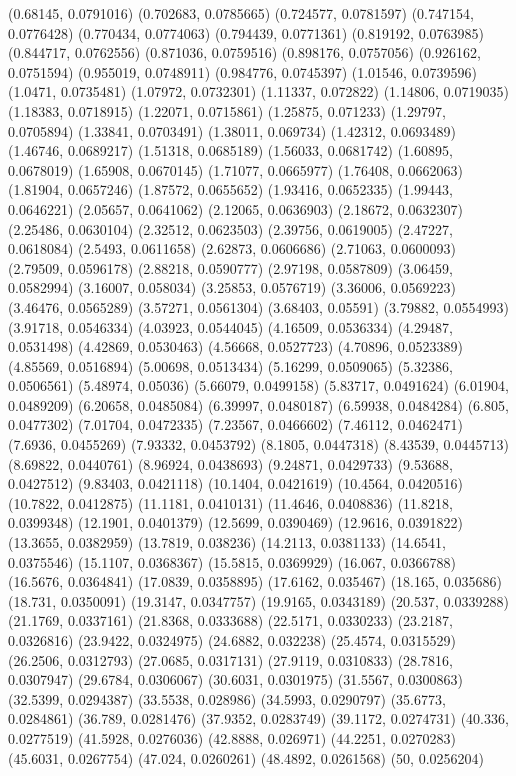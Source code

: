 {(0.68145, 0.0791016)
(0.702683, 0.0785665)
(0.724577, 0.0781597)
(0.747154, 0.0776428)
(0.770434, 0.0774063)
(0.794439, 0.0771361)
(0.819192, 0.0763985)
(0.844717, 0.0762556)
(0.871036, 0.0759516)
(0.898176, 0.0757056)
(0.926162, 0.0751594)
(0.955019, 0.0748911)
(0.984776, 0.0745397)
(1.01546, 0.0739596)
(1.0471, 0.0735481)
(1.07972, 0.0732301)
(1.11337, 0.072822)
(1.14806, 0.0719035)
(1.18383, 0.0718915)
(1.22071, 0.0715861)
(1.25875, 0.071233)
(1.29797, 0.0705894)
(1.33841, 0.0703491)
(1.38011, 0.069734)
(1.42312, 0.0693489)
(1.46746, 0.0689217)
(1.51318, 0.0685189)
(1.56033, 0.0681742)
(1.60895, 0.0678019)
(1.65908, 0.0670145)
(1.71077, 0.0665977)
(1.76408, 0.0662063)
(1.81904, 0.0657246)
(1.87572, 0.0655652)
(1.93416, 0.0652335)
(1.99443, 0.0646221)
(2.05657, 0.0641062)
(2.12065, 0.0636903)
(2.18672, 0.0632307)
(2.25486, 0.0630104)
(2.32512, 0.0623503)
(2.39756, 0.0619005)
(2.47227, 0.0618084)
(2.5493, 0.0611658)
(2.62873, 0.0606686)
(2.71063, 0.0600093)
(2.79509, 0.0596178)
(2.88218, 0.0590777)
(2.97198, 0.0587809)
(3.06459, 0.0582994)
(3.16007, 0.058034)
(3.25853, 0.0576719)
(3.36006, 0.0569223)
(3.46476, 0.0565289)
(3.57271, 0.0561304)
(3.68403, 0.05591)
(3.79882, 0.0554993)
(3.91718, 0.0546334)
(4.03923, 0.0544045)
(4.16509, 0.0536334)
(4.29487, 0.0531498)
(4.42869, 0.0530463)
(4.56668, 0.0527723)
(4.70896, 0.0523389)
(4.85569, 0.0516894)
(5.00698, 0.0513434)
(5.16299, 0.0509065)
(5.32386, 0.0506561)
(5.48974, 0.05036)
(5.66079, 0.0499158)
(5.83717, 0.0491624)
(6.01904, 0.0489209)
(6.20658, 0.0485084)
(6.39997, 0.0480187)
(6.59938, 0.0484284)
(6.805, 0.0477302)
(7.01704, 0.0472335)
(7.23567, 0.0466602)
(7.46112, 0.0462471)
(7.6936, 0.0455269)
(7.93332, 0.0453792)
(8.1805, 0.0447318)
(8.43539, 0.0445713)
(8.69822, 0.0440761)
(8.96924, 0.0438693)
(9.24871, 0.0429733)
(9.53688, 0.0427512)
(9.83403, 0.0421118)
(10.1404, 0.0421619)
(10.4564, 0.0420516)
(10.7822, 0.0412875)
(11.1181, 0.0410131)
(11.4646, 0.0408836)
(11.8218, 0.0399348)
(12.1901, 0.0401379)
(12.5699, 0.0390469)
(12.9616, 0.0391822)
(13.3655, 0.0382959)
(13.7819, 0.038236)
(14.2113, 0.0381133)
(14.6541, 0.0375546)
(15.1107, 0.0368367)
(15.5815, 0.0369929)
(16.067, 0.0366788)
(16.5676, 0.0364841)
(17.0839, 0.0358895)
(17.6162, 0.035467)
(18.165, 0.035686)
(18.731, 0.0350091)
(19.3147, 0.0347757)
(19.9165, 0.0343189)
(20.537, 0.0339288)
(21.1769, 0.0337161)
(21.8368, 0.0333688)
(22.5171, 0.0330233)
(23.2187, 0.0326816)
(23.9422, 0.0324975)
(24.6882, 0.032238)
(25.4574, 0.0315529)
(26.2506, 0.0312793)
(27.0685, 0.0317131)
(27.9119, 0.0310833)
(28.7816, 0.0307947)
(29.6784, 0.0306067)
(30.6031, 0.0301975)
(31.5567, 0.0300863)
(32.5399, 0.0294387)
(33.5538, 0.028986)
(34.5993, 0.0290797)
(35.6773, 0.0284861)
(36.789, 0.0281476)
(37.9352, 0.0283749)
(39.1172, 0.0274731)
(40.336, 0.0277519)
(41.5928, 0.0276036)
(42.8888, 0.026971)
(44.2251, 0.0270283)
(45.6031, 0.0267754)
(47.024, 0.0260261)
(48.4892, 0.0261568)
(50, 0.0256204)
}

